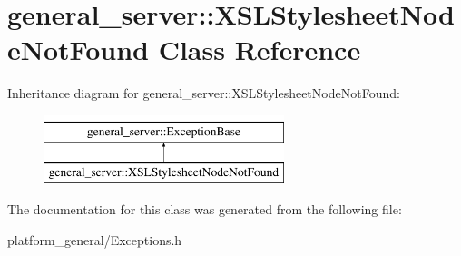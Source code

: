 \hypertarget{classgeneral__server_1_1XSLStylesheetNodeNotFound}{\section{general\-\_\-server\-:\-:\-X\-S\-L\-Stylesheet\-Node\-Not\-Found \-Class \-Reference}
\label{classgeneral__server_1_1XSLStylesheetNodeNotFound}
}
\-Inheritance diagram for general\-\_\-server\-:\-:\-X\-S\-L\-Stylesheet\-Node\-Not\-Found\-:\begin{figure}[H]
\begin{center}
\leavevmode
\includegraphics[height=2.000000cm]{classgeneral__server_1_1XSLStylesheetNodeNotFound}
\end{center}
\end{figure}


\-The documentation for this class was generated from the following file\-:\begin{DoxyCompactItemize}
\item 
platform\-\_\-general/\-Exceptions.\-h\end{DoxyCompactItemize}
